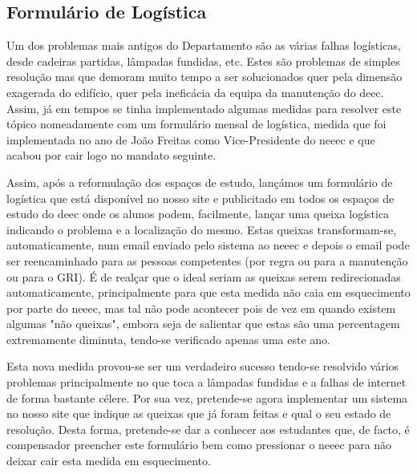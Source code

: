 
\subsection{Formulário de Logística}

Um dos problemas mais antigos do Departamento são as várias falhas logísticas, desde cadeiras partidas, lâmpadas fundidas, etc. Estes são problemas de simples resolução mas que demoram muito tempo a ser solucionados quer pela dimensão exagerada do edifício, quer pela ineficácia da equipa da manutenção do \acrshort{deec}. Assim, já em tempos se tinha implementado algumas medidas para resolver este tópico nomeadamente com um formulário mensal de logística, medida que foi implementada no ano de João Freitas como Vice-Presidente do \acrshort{neeec} e que acabou por cair logo no mandato seguinte.

Assim, após a reformulação dos espaços de estudo, lançámos um formulário de logística que está disponível no nosso site e publicitado em todos os espaços de estudo do \acrshort{deec} onde os alunos podem, facilmente, lançar uma queixa logística indicando o problema e a localização do mesmo. Estas queixas transformam-se, automaticamente, num email enviado pelo sistema ao \acrshort{neeec} e depois o email pode ser reencaminhado para as pessoas competentes (por regra ou para a manutenção ou para o GRI). É de realçar que o ideal seriam as queixas serem redirecionadas automaticamente, principalmente para que esta medida não caia em esquecimento por parte do \acrshort{neeec}, mas tal não pode acontecer pois de vez em quando existem algumas "não queixas", embora seja de salientar que estas são uma percentagem extremamente diminuta, tendo-se verificado apenas uma este ano.

Esta nova medida provou-se ser um verdadeiro sucesso tendo-se resolvido vários problemas principalmente no que toca a lâmpadas fundidas e a falhas de internet de forma bastante célere. Por sua vez, pretende-se agora implementar um sistema no nosso site que indique as queixas que já foram feitas e qual o seu estado de resolução. Desta forma, pretende-se dar a conhecer aos estudantes que, de facto, é compensador preencher este formulário bem como pressionar o \acrshort{neeec} para não deixar cair esta medida em esquecimento.